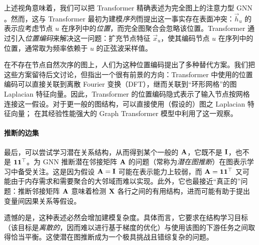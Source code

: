 上述视角意味着，我们可以把 Transformer 精确表述为完全图上的注意力型 GNN \citep{joshi2020transformers}。然而，这与 Transformer 最初为建模\emph{序列}而提出这一事实存在表面冲突：$\vec{h}_u$ 的表示应考虑节点 $u$ 在序列中的\emph{位置}，而完全图聚合会忽略该位置。Transformer 通过引入\emph{位置编码}来解决这一问题：扩充节点特征 $\vec{x}_u$，使其编码节点 $u$ 在序列中的位置，通常取为频率依赖于 $u$ 的正弦波采样值。

在不存在节点自然次序的图上，人们为这种位置编码提出了多种替代方案。我们把这些方案留待后文讨论，但指出一个很有前景的方向：Transformer 中使用的位置编码可以直接关联到离散 Fourier 变换（DFT），继而关联到“环形网格”的图 Laplacian 特征向量。因此，Transformer 的位置编码隐式表示了输入节点按网格连接这一假设。对于更一般的图结构，可以直接使用（假设的）图之 Laplacian 特征向量；\citet{dwivedi2020generalization} 在其经验性能强大的 Graph Transformer 模型中利用了这一观察。


\paragraph*{推断的边集}

最后，可以尝试学习潜在关系结构，从而得到某个一般的 ${\bf A}$，它既不是 ${\bf I}$，也不是 ${\bf 1}{\bf 1}^\top$。为 GNN 推断潜在邻接矩阵 ${\bf A}$ 的问题（常称为\emph{潜在图推断}）在图表示学习中备受关注。这是因为假设 ${\bf A} = {\bf I}$ 可能在表示能力上较弱，而 ${\bf A} = {\bf 1}{\bf 1}^\top$ 又可能由于内存需求和需要聚合的大邻域而难以实现。此外，它也最接近“真正的”问题：推断邻接矩阵 ${\bf A}$ 意味着检测 ${\bf X}$ 各行之间的有用结构，进而可能有助于提出变量间因果关系等假设。

遗憾的是，这种表述必然会增加建模复杂度。具体而言，它要求在结构学习目标（该目标是\emph{离散的}，因而难以进行基于梯度的优化）与使用该图的下游任务之间取得恰当平衡。这使潜在图推断成为一个极具挑战且错综复杂的问题。%

